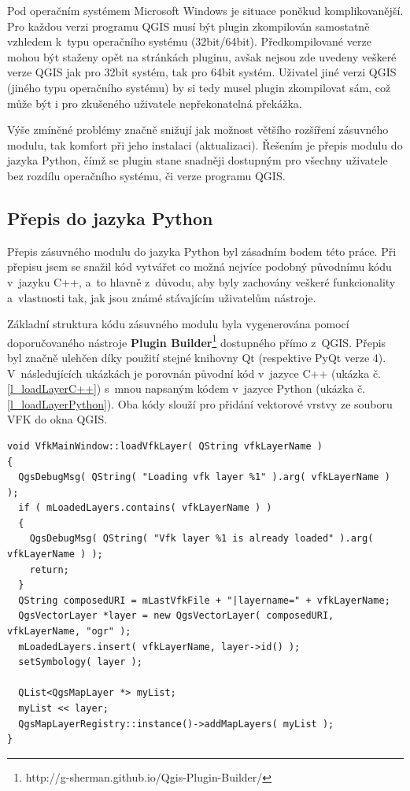 \documentclass[a4paper,12pt,oneside]{book}
\begin{document}
Pod operačním systémem Microsoft Windows je situace poněkud
komplikovanější. Pro každou verzi programu QGIS musí být plugin
zkompilován samostatně vzhledem k~typu operačního systému
(32bit/64bit). Předkompilované verze mohou být staženy opět na
stránkách pluginu, avšak nejsou zde uvedeny veškeré verze QGIS jak pro
32bit systém, tak pro 64bit systém. Uživatel jiné verzi QGIS (jiného
typu operačního systému) by si tedy musel plugin zkompilovat sám, což
může být i pro zkušeného uživatele nepřekonatelná překážka.

Výše zmíněné problémy značně snižují jak možnost většího rozšíření
zásuvného modulu, tak komfort při jeho instalaci
(aktualizaci). Řešením je přepis modulu do jazyka Python, čímž se
plugin stane snadněji dostupným pro všechny uživatele bez rozdílu
operačního systému, či verze programu QGIS.

\subsection{Přepis do jazyka Python}

Přepis zásuvného modulu do jazyka Python byl zásadním bodem této
práce. Při přepisu jsem se snažil kód vytvářet co možná nejvíce
podobný původnímu kódu v~jazyku C++, a~to hlavně z~důvodu, aby byly
zachovány veškeré funkcionality a~vlastnosti tak, jak jsou známé
stávajícím uživatelům nástroje.

Základní struktura kódu zásuvného modulu byla vygenerována pomocí
doporučovaného nástroje \textbf{Plugin
  Builder}\footnote{http://g-sherman.github.io/Qgis-Plugin-Builder/}
dostupného přímo z~QGIS. Přepis byl značně ulehčen díky použití stejné
knihovny Qt (respektive PyQt verze 4). V~následujících ukázkách je
porovnán původní kód v~jazyce C++ (ukázka č. \ref{l_loadLayerC++})
s~mnou napsaným kódem v~jazyce Python (ukázka
č. \ref{l_loadLayerPython}). Oba kódy slouží pro přidání vektorové
vrstvy ze souboru VFK do okna QGIS.

{\scriptsize
\begin{lstlisting}[style=c++, 
		    caption=Kód pro načtení vektorové vrstvy v~C++, 
		    label=l_loadLayerC++]
 void VfkMainWindow::loadVfkLayer( QString vfkLayerName )
{
  QgsDebugMsg( QString( "Loading vfk layer %1" ).arg( vfkLayerName ) );
  if ( mLoadedLayers.contains( vfkLayerName ) )
  {
    QgsDebugMsg( QString( "Vfk layer %1 is already loaded" ).arg( vfkLayerName ) );
    return;
  }
  QString composedURI = mLastVfkFile + "|layername=" + vfkLayerName;
  QgsVectorLayer *layer = new QgsVectorLayer( composedURI, vfkLayerName, "ogr" );
  mLoadedLayers.insert( vfkLayerName, layer->id() );
  setSymbology( layer );

  QList<QgsMapLayer *> myList;
  myList << layer;
  QgsMapLayerRegistry::instance()->addMapLayers( myList );
}
\end{lstlisting}
}
\end{document}
